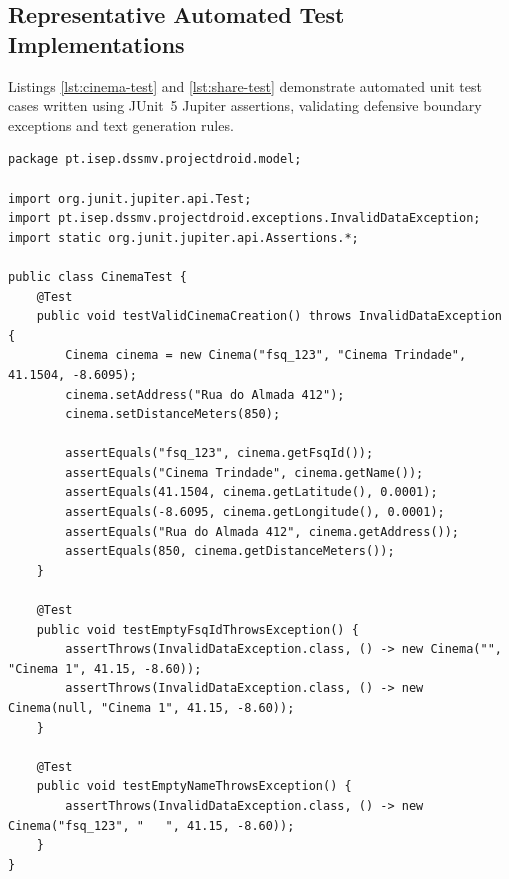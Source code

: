 \documentclass[runningheads,a4paper]{llncs}
\begin{document}
\newpage

\subsection{Representative Automated Test Implementations}
Listings \ref{lst:cinema-test} and \ref{lst:share-test} demonstrate automated unit test cases written using JUnit~5 Jupiter assertions, validating defensive boundary exceptions and text generation rules.

\begin{lstlisting}[style=javastyle,caption={JUnit 5 Automated Domain Tests (CinemaTest.java)},label={lst:cinema-test}]
package pt.isep.dssmv.projectdroid.model;

import org.junit.jupiter.api.Test;
import pt.isep.dssmv.projectdroid.exceptions.InvalidDataException;
import static org.junit.jupiter.api.Assertions.*;

public class CinemaTest {
    @Test
    public void testValidCinemaCreation() throws InvalidDataException {
        Cinema cinema = new Cinema("fsq_123", "Cinema Trindade", 41.1504, -8.6095);
        cinema.setAddress("Rua do Almada 412");
        cinema.setDistanceMeters(850);

        assertEquals("fsq_123", cinema.getFsqId());
        assertEquals("Cinema Trindade", cinema.getName());
        assertEquals(41.1504, cinema.getLatitude(), 0.0001);
        assertEquals(-8.6095, cinema.getLongitude(), 0.0001);
        assertEquals("Rua do Almada 412", cinema.getAddress());
        assertEquals(850, cinema.getDistanceMeters());
    }

    @Test
    public void testEmptyFsqIdThrowsException() {
        assertThrows(InvalidDataException.class, () -> new Cinema("", "Cinema 1", 41.15, -8.60));
        assertThrows(InvalidDataException.class, () -> new Cinema(null, "Cinema 1", 41.15, -8.60));
    }

    @Test
    public void testEmptyNameThrowsException() {
        assertThrows(InvalidDataException.class, () -> new Cinema("fsq_123", "   ", 41.15, -8.60));
    }
}
\end{lstlisting}
\end{document}
